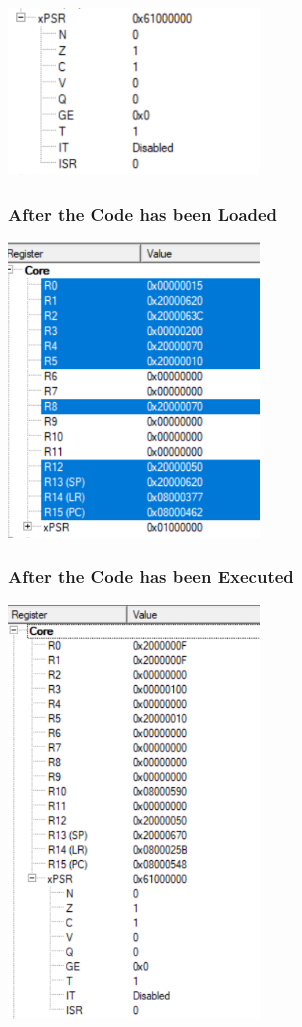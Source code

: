\documentclass{article}
\begin{document}
\begin{center}
    \includegraphics[width=0.5\textwidth]{task_iv_E_PSR.png}
\end{center}

\subsubsection{After the Code has been Loaded}

\begin{center}
    \includegraphics[width=0.5\textwidth]{task_iv_E_before.png}
\end{center}

\subsubsection{After the Code has been Executed}

\begin{center}
    \includegraphics[width=0.5\textwidth]{task_iv_E_after.png}
\end{center}
\end{document}

